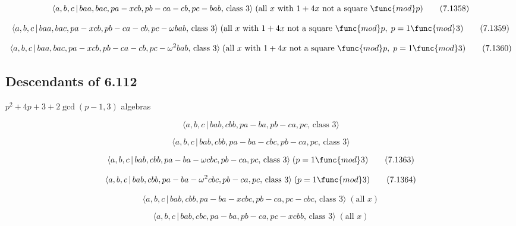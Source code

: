 \documentclass[10pt]{article}
\begin{document}
\begin{equation}
\langle a,b,c\,|\,baa,bac,pa-xcb,pb-ca-cb,pc-bab,\,\text{class }3\rangle \;(%
\text{all }x\text{ with }1+4x\text{ not a square }\func{mod}p)  \tag{7.1358}
\end{equation}

\begin{equation}
\langle a,b,c\,|\,baa,bac,pa-xcb,pb-ca-cb,pc-\omega bab,\,\text{class }%
3\rangle \;(\text{all }x\text{ with }1+4x\text{ not a square }\func{mod}%
p,\;p=1\func{mod}3)  \tag{7.1359}
\end{equation}

\begin{equation}
\langle a,b,c\,|\,baa,bac,pa-xcb,pb-ca-cb,pc-\omega ^{2}bab,\,\text{class }%
3\rangle \;(\text{all }x\text{ with }1+4x\text{ not a square }\func{mod}%
p,\;p=1\func{mod}3)  \tag{7.1360}
\end{equation}

\subsection{Descendants of 6.112}

$p^{2}+4p+3+2\gcd (p-1,3)$ algebras

\begin{equation}
\langle a,b,c\,|\,bab,cbb,pa-ba,pb-ca,pc,\,\text{class }3\rangle 
\tag{7.1361}
\end{equation}

\begin{equation}
\langle a,b,c\,|\,bab,cbb,pa-ba-cbc,pb-ca,pc,\,\text{class }3\rangle 
\tag{7.1362}
\end{equation}

\begin{equation}
\langle a,b,c\,|\,bab,cbb,pa-ba-\omega cbc,pb-ca,pc,\,\text{class }3\rangle
\;(p=1\func{mod}3)  \tag{7.1363}
\end{equation}

\begin{equation}
\langle a,b,c\,|\,bab,cbb,pa-ba-\omega ^{2}cbc,pb-ca,pc,\,\text{class }%
3\rangle \;(p=1\func{mod}3)  \tag{7.1364}
\end{equation}

\begin{equation}
\langle a,b,c\,|\,bab,cbb,pa-ba-xcbc,pb-ca,pc-cbc,\,\text{class }3\rangle \;(%
\text{all }x)  \tag{7.1365}
\end{equation}

\begin{equation}
\langle a,b,c\,|\,bab,cbc,pa-ba,pb-ca,pc-xcbb,\,\text{class }3\rangle \;(%
\text{all }x)  \tag{7.1366}
\end{equation}
\end{document}
